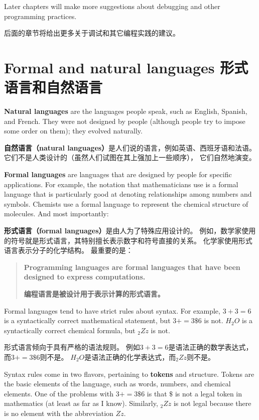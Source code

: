 \documentclass[10pt]{book}
\begin{document}
\begin{CJK}{UTF8}{gbsn}
Later chapters will make more suggestions about debugging and other
programming practices.

后面的章节将给出更多关于调试和其它编程实践的建议。

\section{Formal and natural languages 形式语言和自然语言}

{\bf Natural languages} are the languages people speak,
such as English, Spanish, and French.  They were not designed
by people (although people try to impose some order on them);
they evolved naturally.

{\bf 自然语言（natural languages）}是人们说的语言，例如英语、西班牙语和法语。
它们不是人类设计的（虽然人们试图在其上强加上一些顺序），
它们自然地演变。

{\bf Formal languages} are languages that are designed by people for
specific applications.  For example, the notation that mathematicians
use is a formal language that is particularly good at denoting
relationships among numbers and symbols.  Chemists use a formal
language to represent the chemical structure of molecules.  And
most importantly:

{\bf 形式语言（formal languages）}是由人为了特殊应用设计的。
例如，数学家使用的符号就是形式语言，其特别擅长表示数字和符号直接的关系。
化学家使用形式语言表示分子的化学结构。
最重要的是：

\begin{quote}
{\bf Programming languages are formal languages that have been
designed to express computations.}

{\bf 编程语言是被设计用于表示计算的形式语言。}
\end{quote}

Formal languages tend to have strict rules about syntax.  For example,
$3 + 3 = 6$ is a syntactically correct mathematical statement, but 
$3 + = 3 \mbox{\$} 6$ is not.
$H_2O$ is a syntactically correct
chemical formula, but $_2Zz$ is not.

形式语言倾向于具有严格的语法规则。
例如$3 + 3 = 6$是语法正确的数学表达式，而$3 + = 3 \mbox{\$} 6$则不是。
$H_2O$是语法正确的化学表达式，而$_2Zz$则不是。

Syntax rules come in two flavors, pertaining to {\bf tokens} and
structure.  Tokens are the basic elements of the language, such as
words, numbers, and chemical elements.  One of the problems with
$3 + = 3 \mbox{\$} 6$ is that \( \$ \) is not a legal token in mathematics
(at least as far as I know).  Similarly, $_2Zz$ is not legal because
there is no element with the abbreviation $Zz$.


\end{CJK}
\end{document}
